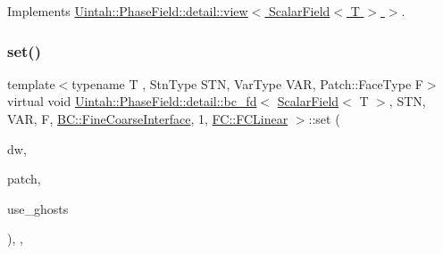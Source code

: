 Implements \hyperlink{classUintah_1_1PhaseField_1_1detail_1_1view_3_01ScalarField_3_01T_01_4_01_4_aea43cfedfe3b6f3c038ff795caec49b8}{Uintah\+::\+Phase\+Field\+::detail\+::view$<$ Scalar\+Field$<$ T $>$ $>$}.

\mbox{\label{classUintah_1_1PhaseField_1_1detail_1_1bc__fd_3_01ScalarField_3_01T_01_4_00_01STN_00_01VAR_00_01f836207db876ecd28bf65f631f79030f_a8e9206230f471f1e83e57b2d123fa9be}} 
\subsubsection{\texorpdfstring{set()}{set()}\hspace{0.1cm}{\footnotesize\ttfamily [1/2]}}
{\footnotesize\ttfamily template$<$typename T , Stn\+Type S\+TN, Var\+Type V\+AR, Patch\+::\+Face\+Type F$>$ \\
virtual void \hyperlink{classUintah_1_1PhaseField_1_1detail_1_1bc__fd}{Uintah\+::\+Phase\+Field\+::detail\+::bc\+\_\+fd}$<$ \hyperlink{structUintah_1_1PhaseField_1_1ScalarField}{Scalar\+Field}$<$ T $>$, S\+TN, V\+AR, F, \hyperlink{namespaceUintah_1_1PhaseField_a148fba372aa3be96fd6eede7a2fa10b5ad2d89be9637ff8b537fa4b6026c0e574}{B\+C\+::\+Fine\+Coarse\+Interface}, 1, \hyperlink{namespaceUintah_1_1PhaseField_aeb51fe956fe07f1487f5878f4039f27ca7460527a4d3065117218d8822530ed6a}{F\+C\+::\+F\+C\+Linear} $>$\+::set (\begin{DoxyParamCaption}\item[{Data\+Warehouse $\ast$}]{dw,  }\item[{const Patch $\ast$}]{patch,  }\item[{bool}]{use\+\_\+ghosts }\end{DoxyParamCaption})\hspace{0.3cm}{\ttfamily [inline]}, {\ttfamily [override]}, {\ttfamily [virtual]}}



